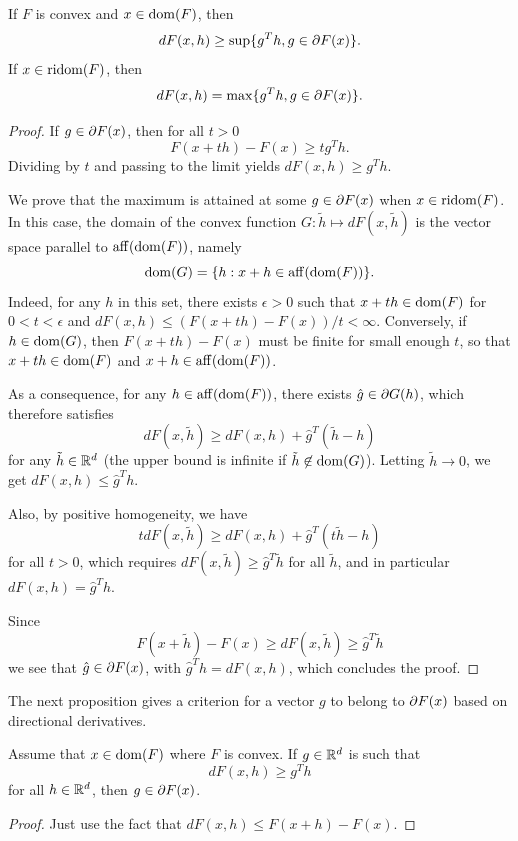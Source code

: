 \begin{proposition}
\label{prop:directional.subg}
If $F$ is convex and $x\in \mathrm{dom}(F)$, then
\[
dF(x, h) \geq \sup\{ g^T h, g\in \partial F(x)\}.
\]
If $x\in \mathrm{ridom}(F)$, then
\[
dF(x, h) = \max\{ g^T h, g\in \partial F(x)\}.
\]
\end{proposition}
\begin{proof}
If $g\in \partial F(x)$, then for all $t>0$
\[
F(x + th) - F(x) \geq t g^Th.
\]
Dividing by $t$ and passing to the limit yields $dF(x,h) \geq g^T h$. 

We prove that the maximum is attained at some $g \in \partial F(x)$ when $x\in \mathrm{ridom}(F)$. In this case,  the domain of the convex function  $G: \tilde h \mapsto dF(x,\tilde h)$  is the vector space parallel to $\mathrm{aff}(\mathrm{dom}(F))$, namely
\[
\mathrm{dom}(G) = \{h: x+h \in \mathrm{aff}(\mathrm{dom}(F))\}.
\]
Indeed, for any $h$ in this set, there exists $\epsilon>0$ such that $x+th \in \mathrm{dom}(F)$ for $0<t<\epsilon$ and $dF(x, h) \leq (F(x+th) - F(x))/t < \infty$. Conversely, if $h\in \mathrm{dom}(G)$, then $F(x+th) - F(x)$ must be finite for small enough $t$, so that $x+th\in \mathrm{dom}(F)$ and $x+h \in \mathrm{aff}(\mathrm{dom}(F))$.

As a consequence, for any $h\in\mathrm{aff}(\mathrm{dom}(F))$,  there exists $\hat g \in  \partial G(h)$, which therefore satisfies
\[
dF(x, \tilde h) \geq dF(x, h) + \hat g^T(\tilde h - h)
\]
for any   $\tilde h\in {\mathbb{R}}^d$ (the upper bound is infinite if $\tilde h\not\in \mathrm{dom}(G)$). Letting $\tilde h\to 0$, we get $dF(x,h) \leq \hat g^T h$. 

Also, by positive homogeneity, we have
\[
tdF(x, \tilde h) \geq dF(x, h) + \hat g^T(t\tilde h - h)
\]
for all $t>0$, which requires $dF(x,\tilde h) \geq \hat g^T \tilde h$ for all $\tilde h$, and in particular $dF(x,h)  = \hat g^T h$. 

Since 
\[
F(x+\tilde h) - F(x) \geq dF(x, \tilde h) \geq \hat g^T \tilde h
\]
we see that $\hat g \in \partial F(x)$, with $\hat g^T h = dF(x,h)$, which concludes the proof. 
\end{proof}

The next proposition gives a criterion for a vector $g$ to belong to $\partial F(x)$ based on directional derivatives.

\begin{proposition}
\label{prop:subg.directional}
Assume that $x\in \mathrm{dom}(F)$ where $F$ is convex. If $g\in {\mathbb{R}}^d$ is such that 
\[
dF(x,h) \geq g^T h
\]
for all $h\in {\mathbb{R}}^d$, then $g\in \partial F(x)$.
\end{proposition}
\begin{proof}
Just use the fact that $dF(x, h) \leq F(x+h) - F(x)$.
\end{proof}

